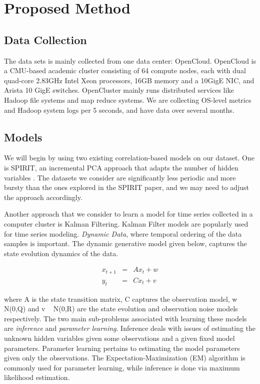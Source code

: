 \section{Proposed Method}
\label{sec:method}

\subsection{Data Collection}
\label{sec:method:data}
The data sets is mainly collected from one data center: OpenCloud. OpenCloud is a CMU-based academic cluster consisting of 64 compute nodes, each with dual quad-core 2.83GHz Intel Xeon processors, 16GB memory and a 10GigE NIC, and Arista 10 GigE switches. OpenCluster mainly runs distributed services like Hadoop file systems and map reduce systems. We are collecting OS-level metrics and Hadoop system logs per 5 seconds, and have data over several months.

\subsection{Models}
\label{sec:method:models}
We will begin by using two existing correlation-based models on our dataset. One is SPIRIT, an incremental PCA approach that adapts the number of hidden variables \cite{Papdimitriou2005}. The datasets we consider are significantly less periodic and more bursty than the ones explored in the SPIRIT paper, and we may need to adjust the approach accordingly.

Another approach that we consider to learn a model for time series collected in a computer cluster is Kalman Filtering. Kalman Filter models are popularly used for time series modeling. \emph{Dynamic Data}, where temporal ordering of the data samples is important. The dynamic generative model given below, captures the state evolution dynamics of the data.

\begin{eqnarray}
x_{t+1} &=& Ax_t + w \\
y_t  &=& Cx_t + v
\end{eqnarray}

where A is the state transition matrix, C captures the observation model, w ~ N(0,Q) and v ~ N(0,R) are the state evolution and observation noise models respectively. The two main sub-problems associated with learning these models are \emph{inference} and \emph{parameter learning}. Inference deals with issues of estimating the unknown hidden variables given some observations and a given fixed model parameters. Parameter learning pertains to estimating the model parameters given only the  observations. The Expectation-Maximization (EM) algorithm is commonly used for parameter learning, while inference is done via maximum likelihood estimation.


